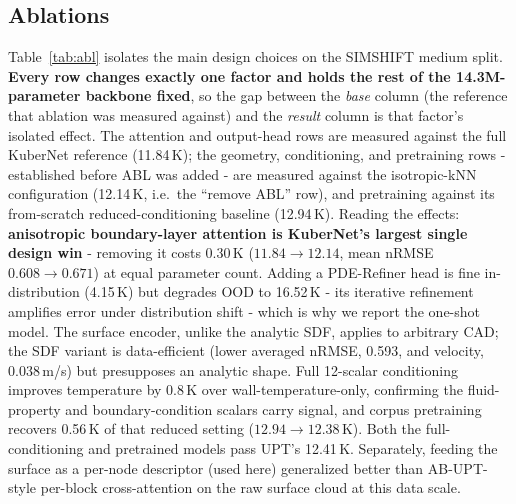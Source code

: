 \documentclass[conference]{IEEEtran}
\begin{document}
\subsection{Ablations}\label{sec:ablation}
Table~\ref{tab:abl} isolates the main design choices on the SIMSHIFT medium split. \textbf{Every row changes
exactly one factor and holds the rest of the 14.3M-parameter backbone fixed}, so the gap between the
\emph{base} column (the reference that ablation was measured against) and the \emph{result} column is that
factor's isolated effect. The attention and output-head rows are measured against the full KuberNet reference
(11.84\,K); the geometry, conditioning, and pretraining rows - established before ABL was added - are measured
against the isotropic-kNN configuration (12.14\,K, i.e.\ the ``remove ABL'' row), and pretraining against its
from-scratch reduced-conditioning baseline (12.94\,K). Reading the effects: \textbf{anisotropic boundary-layer
attention is KuberNet's largest single design win} - removing it costs 0.30\,K ($11.84\!\to\!12.14$, mean nRMSE
$0.608\!\to\!0.671$) at equal parameter count. Adding a PDE-Refiner head is fine in-distribution (4.15\,K) but
degrades OOD to 16.52\,K - its iterative refinement amplifies error under distribution shift - which is why we
report the one-shot model. The surface encoder, unlike the analytic SDF, applies to arbitrary CAD; the SDF
variant is data-efficient (lower averaged nRMSE, 0.593, and velocity, 0.038\,m/s) but presupposes an analytic
shape. Full 12-scalar conditioning improves temperature by 0.8\,K over wall-temperature-only, confirming the
fluid-property and boundary-condition scalars carry signal, and corpus pretraining recovers 0.56\,K of that
reduced setting ($12.94\!\to\!12.38$\,K). Both the full-conditioning and pretrained models pass UPT's
12.41\,K. Separately, feeding the surface as a per-node descriptor (used here) generalized better than
AB-UPT-style per-block cross-attention on the raw surface cloud at this data scale.
\end{document}

